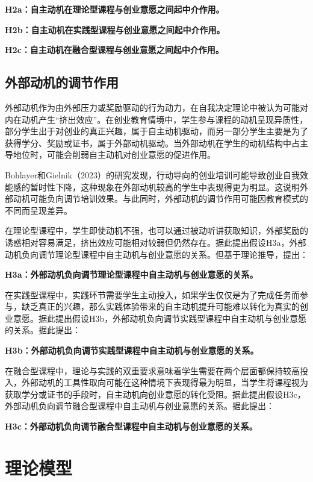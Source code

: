 \textbf{H2a：自主动机在理论型课程与创业意愿之间起中介作用。}

\textbf{H2b：自主动机在实践型课程与创业意愿之间起中介作用。}

\textbf{H2c：自主动机在融合型课程与创业意愿之间起中介作用。}

\subsection{外部动机的调节作用}

外部动机作为由外部压力或奖励驱动的行为动力，在自我决定理论中被认为可能对内在动机产生\nolinebreak[3]“挤出效应”。在创业教育情境中，学生参与课程的动机呈现异质性，部分学生出于对创业的真正兴趣，属于自主动机驱动，而另一部分学生主要是为了获得学分、奖励或证书，属于外部动机驱动。当外部动机在学生的动机结构中占主导地位时，可能会削弱自主动机对创业意愿的促进作用。

Bohlayer和Gielnik\nolinebreak[3]（2023）的研究发现，行动导向的创业培训可能导致创业自我效能感的暂时性下降，这种现象在外部动机较高的学生中表现得更为明显\cite{Bohlayer2023}。这说明外部动机可能负向调节培训效果。与此同时，外部动机的调节作用可能因教育模式的不同而呈现差异。

在理论型课程中，学生即使动机不强，也可以通过被动听讲获取知识，外部奖励的诱惑相对容易满足，挤出效应可能相对较弱但仍然存在。据此提出假设H3a，外部动机负向调节理论型课程中自主动机与创业意愿的关系。但基于理论推导，提出：

\textbf{H3a：外部动机负向调节理论型课程中自主动机与创业意愿的关系。}

在实践型课程中，实践环节需要学生主动投入，如果学生仅仅是为了完成任务而参与，缺乏真正的兴趣，那么实践体验带来的自主动机提升可能难以转化为真实的创业意愿。据此提出假设H3b，外部动机负向调节实践型课程中自主动机与创业意愿的关系。据此提出：

\textbf{H3b：外部动机负向调节实践型课程中自主动机与创业意愿的关系。}

在融合型课程中，理论与实践的双重要求意味着学生需要在两个层面都保持较高投入，外部动机的工具性取向可能在这种情境下表现得最为明显，当学生将课程视为获取学分或证书的手段时，自主动机向创业意愿的转化受阻。据此提出假设H3c，外部动机负向调节融合型课程中自主动机与创业意愿的关系。据此提出：

\textbf{H3c：外部动机负向调节融合型课程中自主动机与创业意愿的关系。}

\section{理论模型}

